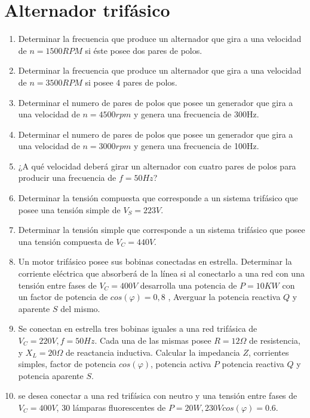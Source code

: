 \documentclass[../main]{subfiles}
\begin{document}
\chapter{Alternador trifásico}
\begin{enumerate}
    \item Determinar la frecuencia que produce un alternador que gira a una velocidad de $n=1500 RPM$ si éste posee dos pares de polos.
    \item Determinar la frecuencia que produce un alternador que gira a una velocidad de $n=3500 RPM$ si posee 4 pares de polos.
    \item Determinar el numero de pares de polos que posee un generador que gira a una velocidad de $n=4500rpm$ y genera una frecuencia de 300Hz.
    \item Determinar el numero de pares de polos que posee un generador que gira a una velocidad de $n=3000rpm$ y genera una frecuencia de 100Hz.
    \item ¿A qué velocidad deberá girar un alternador con cuatro pares de polos para producir una frecuencia de $f=50Hz$?
    \item Determinar la tensión compuesta que corresponde a un sistema trifásico que posee una tensión simple de $V_S=223V$.
    \item Determinar la tensión simple que corresponde a un sistema trifásico que posee una tensión compuesta de $V_C=440V$.
    \item Un motor trifásico posee sus bobinas conectadas en estrella. Determinar la corriente eléctrica que absorberá de la línea si al conectarlo a una red con una tensión entre fases de $V_C=400V$ desarrolla una potencia de $P=10KW$ con un factor de potencia de $cos(\varphi)=0,8$ , Averguar la potencia reactiva $Q$ y aparente $S$ del mismo.
    \item Se conectan en estrella tres bobinas iguales a una red trifásica de $V_C=220V, f=50Hz$. Cada una de las mismas posee $R=12\Omega$ de resistencia, y $X_L=20\Omega$ de reactancia inductiva. Calcular la impedancia $Z$, corrientes simples, factor de potencia $cos(\varphi)$, potencia activa $P$ potencia reactiva $Q$ y potencia aparente  $S$.
    \item se desea conectar a una red trifásica con neutro y una tensión entre fases de $V_C=400V$, 30 lámparas fluorescentes de $P=20W,230V cos(\varphi)=0.6$.

\end{enumerate}
\end{document}
